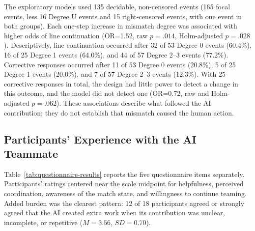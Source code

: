 \documentclass[manuscript,review,anonymous]{acmart}
\begin{document}
The exploratory models used 135 decidable, non-censored events (165 focal events, less 16 Degree U events and 15 right-censored events, with one event in both groups). Each one-step increase in mismatch degree was associated with higher odds of line continuation (OR=1.52, raw $p=.014$, Holm-adjusted $p=.028$). Descriptively, line continuation occurred after 32 of 53 Degree 0 events (60.4\%), 16 of 25 Degree 1 events (64.0\%), and 44 of 57 Degree 2--3 events (77.2\%). Corrective responses occurred after 11 of 53 Degree 0 events (20.8\%), 5 of 25 Degree 1 events (20.0\%), and 7 of 57 Degree 2--3 events (12.3\%). With 25 corrective responses in total, the design had little power to detect a change in this outcome, and the model did not detect one (OR=0.72, raw and Holm-adjusted $p=.062$). These associations describe what followed the AI contribution; they do not establish that mismatch caused the human action.

\subsection{Participants' Experience with the AI Teammate}

Table~\ref{tab:questionnaire-results} reports the five questionnaire items separately. Participants' ratings centered near the scale midpoint for helpfulness, perceived coordination, awareness of the match state, and willingness to continue teaming. Added burden was the clearest pattern: 12 of 18 participants agreed or strongly agreed that the AI created extra work when its contribution was unclear, incomplete, or repetitive ($M=3.56$, $SD=0.70$).
\end{document}
